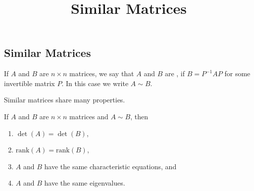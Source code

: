 \documentclass{ximera}
\title{Similar Matrices} \license{CC BY-NC-SA 4.0}
\begin{document}
\begin{abstract}
\end{abstract}
\maketitle

\begin{onlineOnly}
\section*{Similar Matrices}
\end{onlineOnly}


\begin{definition}\label{def:similar}
If $A$ and $B$ are $n \times n$ matrices, we say that $A$ and $B$ are , if $B = P^{-1}AP$ for some invertible matrix $P$.  In this case we write $A \sim B$.
\end{definition}

Similar matrices share many properties. 

\begin{theorem}\label{th:properties_similar}
If $A$ and $B$ are $n\times n$ matrices and $A\sim B$, then
\begin{enumerate}
\item\label{th:properties_similar_det} $\det(A) = \det(B)$,
\item\label{th:properties_similar_rank} $\mbox{rank}(A) = \mbox{rank}(B)$,
\item\label{th:properties_similar_char_poly} $A$ and $B$ have the same characteristic equations, and
\item\label{th:properties_similar_eig} $A$ and $B$ have the same eigenvalues.
\end{enumerate}
\end{theorem}
\end{document}
